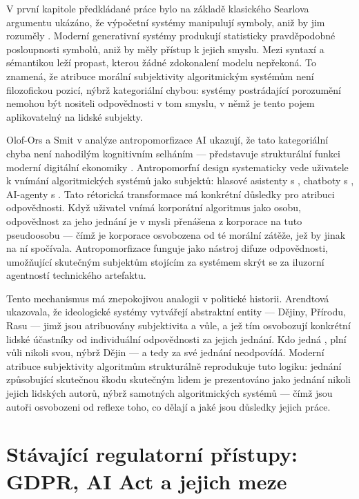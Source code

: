 V první kapitole předkládané práce bylo na základě klasického Searlova argumentu ukázáno, že výpočetní systémy manipulují symboly, aniž by jim rozuměly \parencite{Searle80}. Moderní generativní systémy produkují statisticky pravděpodobné posloupnosti symbolů, aniž by měly přístup k jejich smyslu. Mezi syntaxí a sémantikou leží propast, kterou žádné zdokonalení modelu nepřekoná. To znamená, že atribuce morální subjektivity algoritmickým systémům není filozofickou pozicí, nýbrž kategoriální chybou: systémy postrádající porozumění nemohou být nositeli odpovědnosti v tom smyslu, v němž je tento pojem aplikovatelný na lidské subjekty.

Olof-Ors a Smit v analýze antropomorfizace AI ukazují, že tato kategoriální chyba není nahodilým kognitivním selháním — představuje strukturální funkci moderní digitální ekonomiky \parencite{OlofOrsSmit25}. Antropomorfní design systematicky vede uživatele k vnímání algoritmických systémů jako subjektů: hlasové asistenty s , chatboty s , AI-agenty s . Tato rétorická transformace má konkrétní důsledky pro atribuci odpovědnosti. Když uživatel vnímá korporátní algoritmus jako osobu, odpovědnost za jeho jednání je v mysli přenášena z korporace na tuto pseudoosobu — čímž je korporace osvobozena od té morální zátěže, jež by jinak na ní spočívala. Antropomorfizace funguje jako nástroj difuze odpovědnosti, umožňující skutečným subjektům stojícím za systémem skrýt se za iluzorní agentností technického artefaktu.

Tento mechanismus má znepokojivou analogii v politické historii. Arendtová ukazovala, že ideologické systémy vytvářejí abstraktní entity — Dějiny, Přírodu, Rasu — jimž jsou atribuovány subjektivita a vůle, a jež tím osvobozují konkrétní lidské účastníky od individuální odpovědnosti za jejich jednání. Kdo jedná , plní vůli nikoli svou, nýbrž Dějin — a tedy za své jednání neodpovídá. Moderní atribuce subjektivity algoritmům strukturálně reprodukuje tuto logiku: jednání způsobující skutečnou škodu skutečným lidem je prezentováno jako jednání nikoli jejich lidských autorů, nýbrž samotných algoritmických systémů — čímž jsou autoři osvobozeni od reflexe toho, co dělají a jaké jsou důsledky jejich práce.

\section{Stávající regulatorní přístupy: GDPR, AI Act a jejich meze}

